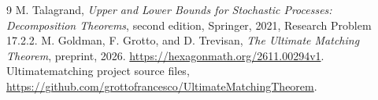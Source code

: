 \documentclass[11pt]{article}
\numberwithin{equation}{section}
\begin{document}
\begin{thebibliography}{9}
M. Talagrand, \emph{Upper and Lower Bounds for Stochastic Processes:
Decomposition Theorems}, second edition, Springer, 2021,
Research Problem 17.2.2.
M. Goldman, F. Grotto, and D. Trevisan,
\emph{The Ultimate Matching Theorem}, preprint, 2026.
\url{https://hexagonmath.org/2611.00294v1}.
Ultimatematching project source files,
\url{https://github.com/grottofrancesco/UltimateMatchingTheorem}.
\end{thebibliography}
\end{document}
